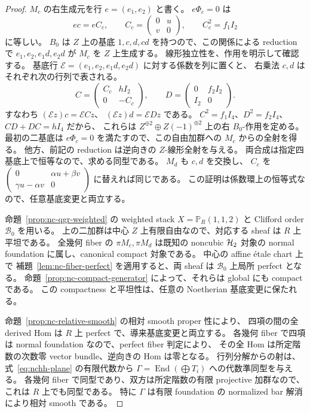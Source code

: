 \begin{proof}
$M_c$ の右生成元を行 $e=(e_1,e_2)$ と書く。
$e\Phi_c=0$ は
\[
 e c=e C_c,\qquad C_c=\begin{pmatrix}0&u\\v&0\end{pmatrix},
 \qquad C_c^2=f_1I_2
\]
に等しい。
$B_0$ は $Z$ 上の基底 $1,c,d,cd$ を持つので、この関係による reduction で
$e_1,e_2,e_1d,e_2d$ が $M_c$ を $Z$ 上生成する。
線形独立性を、作用を明示して確認する。
基底行 $\mathcal E=(e_1,e_2,e_1d,e_2d)$ に対する係数を列に置くと、
右乗法 $c,d$ はそれぞれ次の行列で表される。
\[
 C=\begin{pmatrix}C_c&hI_2\\0&-C_c\end{pmatrix},\qquad
 D=\begin{pmatrix}0&f_2I_2\\I_2&0\end{pmatrix}.
\]
すなわち $(\mathcal E z)c=\mathcal E Cz$、
$(\mathcal E z)d=\mathcal E Dz$ である。
$C^2=f_1I_4$、$D^2=f_2I_4$、$CD+DC=hI_4$ だから、
これらは $Z^{\oplus2}\oplus Z(-1)^{\oplus2}$ 上の右 $B_0$-作用を定める。
最初の二基底は $e\Phi_c=0$ を満たすので、この自由加群への
$M_c$ からの全射を得る。
他方、前記の reduction は逆向きの $Z$-線形全射を与える。
両合成は指定四基底上で恒等なので、求める同型である。
$M_d$ も $c,d$ を交換し、
$C_c$ を $\left(\begin{smallmatrix}0&\alpha u+\beta v\\
\gamma u-\alpha v&0\end{smallmatrix}\right)$ に替えれば同じである。
この証明は係数環上の恒等式なので、任意基底変更と両立する。

命題~\ref{prop:nc-qgr-weighted} の weighted stack
$X=\mathbb P_R(1,1,2)$ と Clifford order $\mathcal B_0$ を用いる。
上の二加群は中心 $Z$ 上有限自由なので、対応する sheaf は $R$ 上平坦である。
全幾何 fiber の $\pi M_c,\pi M_d$ は既知の noncubic $\mathcal H_2$ 対象の
normal foundation に属し、canonical compact 対象である。
中心の affine \texorpdfstring{\'etale}{etale} chart 上で
補題~\ref{lem:nc-fiber-perfect} を適用すると、両 sheaf は $\mathcal B_0$ 上局所 perfect となる。
命題~\ref{prop:nc-compact-generator} によって、それらは global にも compact である。
この compactness と平坦性は、任意の Noetherian 基底変更に保たれる。

命題~\ref{prop:nc-relative-smooth} の相対 smooth proper 性により、
四項の間の全 derived Hom は $R$ 上 perfect で、導来基底変更と両立する。
各幾何 fiber で四項は normal foundation なので、perfect fiber 判定により、
その全 Hom は所定階数の次数零 vector bundle、逆向きの Hom は零となる。
行列分解からの射は、式~\ref{eq:nchh-plane} の有限代数から
$\Gamma=\operatorname{End}(\bigoplus T_i)$ への代数準同型を与える。
各幾何 fiber で同型であり、双方は所定階数の有限 projective 加群なので、
これは $R$ 上でも同型である。
特に $\Gamma$ は有限 foundation の normalized bar 解消により相対 smooth である。


\end{proof}
